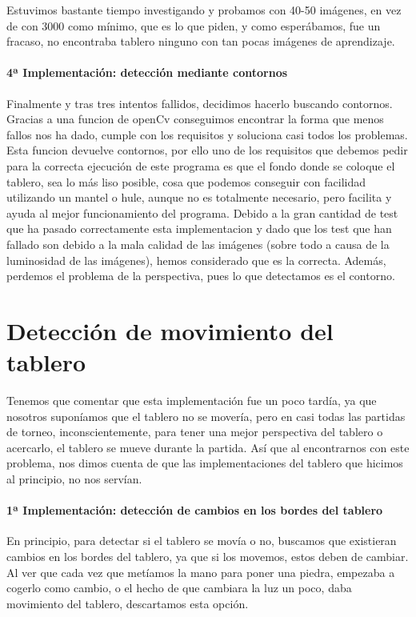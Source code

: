 \documentclass[12pt,a4paper]{report}
\begin{document}
Estuvimos bastante tiempo investigando y probamos con 40-50 imágenes, en vez de
con 3000 como mínimo, que es lo que piden, y como esperábamos, fue un fracaso,
no encontraba tablero ninguno con tan pocas imágenes de aprendizaje. 

\paragraph{4ª Implementación: detección mediante contornos}

Finalmente y tras tres intentos fallidos, decidimos hacerlo buscando contornos.
Gracias a una funcion de openCv conseguimos encontrar la forma que menos fallos
nos ha dado, cumple con los requisitos y soluciona casi todos los problemas.
Esta funcion devuelve contornos, por ello uno de los requisitos que debemos
pedir para la correcta ejecución de este programa es que el fondo donde se
coloque el tablero, sea lo más liso posible, cosa que podemos conseguir con
facilidad utilizando un mantel o hule, aunque no es totalmente necesario, pero
facilita y ayuda al mejor funcionamiento del programa. Debido a la gran cantidad
de test que ha pasado correctamente esta implementacion y dado que los test que
han fallado son debido a la mala calidad de las imágenes (sobre todo a causa de
la luminosidad de las imágenes), hemos considerado que es la correcta. Además,
perdemos el problema de la perspectiva, pues lo que detectamos es el contorno.


\section{Detección de movimiento del tablero}

Tenemos que comentar que esta implementación fue un poco tardía, ya que nosotros
suponíamos que el tablero no se movería, pero en casi todas las partidas de
torneo, inconscientemente, para tener una mejor perspectiva del tablero o
acercarlo, el tablero se mueve durante la partida. Así que al encontrarnos con
este problema, nos dimos cuenta de que las implementaciones del tablero que
hicimos al principio, no nos servían. 

\paragraph{1ª Implementación: detección de cambios en los bordes del tablero}

En principio, para detectar si el tablero se movía o no, buscamos que existieran
cambios en los bordes del tablero, ya que si los movemos, estos deben de
cambiar. Al ver que cada vez que metíamos la mano para poner una piedra,
empezaba a cogerlo como cambio, o el hecho de que cambiara la luz un poco, daba
movimiento del tablero, descartamos esta opción. 
\end{document}
